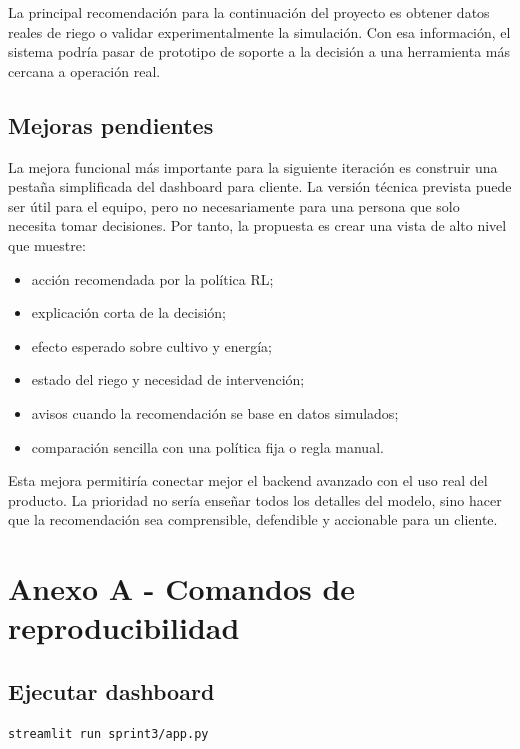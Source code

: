 \documentclass[11pt,a4paper]{article}
\begin{document}
La principal recomendación para la continuación del proyecto es obtener datos reales de riego o validar experimentalmente la simulación. Con esa información, el sistema podría pasar de prototipo de soporte a la decisión a una herramienta más cercana a operación real.

\subsection{Mejoras pendientes}

La mejora funcional más importante para la siguiente iteración es construir una pestaña simplificada del dashboard para cliente. La versión técnica prevista puede ser útil para el equipo, pero no necesariamente para una persona que solo necesita tomar decisiones. Por tanto, la propuesta es crear una vista de alto nivel que muestre:

\begin{itemize}
    \item acción recomendada por la política RL;
    \item explicación corta de la decisión;
    \item efecto esperado sobre cultivo y energía;
    \item estado del riego y necesidad de intervención;
    \item avisos cuando la recomendación se base en datos simulados;
    \item comparación sencilla con una política fija o regla manual.
\end{itemize}

Esta mejora permitiría conectar mejor el backend avanzado con el uso real del producto. La prioridad no sería enseñar todos los detalles del modelo, sino hacer que la recomendación sea comprensible, defendible y accionable para un cliente.

\appendix

\newpage

\section{Anexo A - Comandos de reproducibilidad}

\subsection{Ejecutar dashboard}

\begin{verbatim}
streamlit run sprint3/app.py
\end{verbatim}
\end{document}
